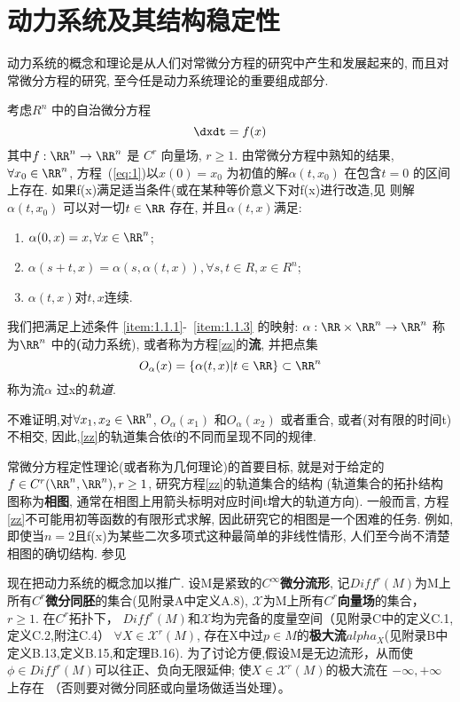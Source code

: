 \section{动力系统及其结构稳定性}\label{1.1}
动力系统的概念和理论是从人们对常微分方程的研究中产生和发展起来的,
而且对常微分方程的研究,
至今任是动力系统理论的重要组成部分.

考虑\(R^n\) 中的自治微分方程
\begin{equation}
    \label{eq:1.1.1}
  \dxdt=f(x)
\end{equation}
其中\(f:\RR^n \to \RR^n\) 是 \(C^r\) 向量场,
\(r \geq 1\).
由常微分方程中熟知的结果,
\(\forall x_0 \in \RR^n\),
方程~(\ref{eq:1})以\(x(0)=x_0\) 为初值的解\(\alpha(t,x_0)\) 在包含\(t=0\) 的区间上存在.
如果f(x)满足适当条件(或在某种等价意义下对f(x)进行改造,见
则解\(\alpha(t,x_0)\) 可以对一切\(t\in \RR\) 存在,
并且\(\alpha(t,x)\)满足:

\begin{enumerate}
\item\label{item:1.1.1}
  \(\alpha(0,x)=x,\forall x \in \RR^n\);
\item\label{item:1.1.2}
  \(\alpha(s+t,x)=\alpha(s,\alpha(t,x)),\forall s,t \in R ,x \in R^n\);
\item\label{item:1.1.3}
  \(\alpha(t,x)\)对\(t,x\)连续.
\end{enumerate}
我们把满足上述条件
\ref{item:1.1.1}-~\ref{item:1.1.3}
的映射:
\(\alpha:\RR \times \RR^n \to \RR^n\)
称为\(\RR^n\) 中的\textbf(动力系统),
或者称为方程\ref{zz}的\textbf{流},
并把点集
\[O_\alpha(x)=\{\alpha(t,x)|t\in \RR\}\subset \RR^n\]
称为流\(\alpha\) 过x的\emph{轨道}.


不难证明,对\(\forall x_1,x_2 \in \RR^n\),
\(O_\alpha(x_1)\) 和\(O_\alpha(x_2)\) 或者重合,
或者(对有限的时间t)不相交,
因此,\ref{zz}的轨道集合依f的不同而呈现不同的规律.


常微分方程定性理论(或者称为几何理论)的首要目标,
就是对于给定的\(f\in C^r(\RR^n,\RR^n),r \geq 1\),
研究方程\ref{zz}的轨道集合的结构
(轨道集合的拓扑结构图称为\textbf{相图},
通常在相图上用箭头标明对应时间t增大的轨道方向).
一般而言,
方程\ref{zz}不可能用初等函数的有限形式求解, 
因此研究它的相图是一个困难的任务.
例如,即使当\(n=2\)且f(x)为某些二次多项式这种最简单的非线性情形,
人们至今尚不清楚相图的确切结构.
参见
\cite{y12}
\cite{q}


现在把动力系统的概念加以推广.
设M是紧致的\(C^\infty\)\textbf{微分流形},
记\(Diff^r(M)\)为M上所有\textbf{\(C^r\)微分同胚}的集合(见附录A中定义A.8),
\(\mathcal{X}\)为M上所有\(C^r\)\textbf{向量场}的集合，
\(r \geq 1\).
在\(C^r\)拓扑下，
\(Diff^r(M)\)和\(\mathcal{X}\)均为完备的度量空间（见附录C中的定义C.1,定义C.2,附注C.4）
\(\forall X \in \mathcal{X}^r(M)\),
存在X中过\(p\in M\)的\textbf{极大流}\(alpha_X\)(见附录B中定义B.13,定义B.15,和定理B.16).
为了讨论方便,假设M是无边流形，从而使
\(\phi \in Diff^r(M)\)可以往正、负向无限延伸;
使\(X \in \mathcal{X}^r(M)\)的极大流在
\(-\infty,+\infty\)上存在
（否则要对微分同胚或向量场做适当处理）。


